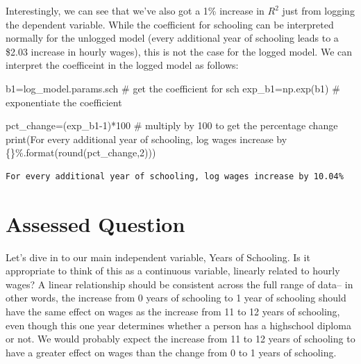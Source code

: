 \documentclass[
  letterpaper,
  DIV=11,
  numbers=noendperiod]{scrreprt}
\newenvironment{Shaded}{\begin{snugshade}}{\end{snugshade}}
\newcommand{\BuiltInTok}[1]{\textcolor[rgb]{0.00,0.23,0.31}{#1}}
\newcommand{\CommentTok}[1]{\textcolor[rgb]{0.37,0.37,0.37}{#1}}
\newcommand{\DecValTok}[1]{\textcolor[rgb]{0.68,0.00,0.00}{#1}}
\newcommand{\NormalTok}[1]{\textcolor[rgb]{0.00,0.23,0.31}{#1}}
\newcommand{\OperatorTok}[1]{\textcolor[rgb]{0.37,0.37,0.37}{#1}}
\newcommand{\SpecialCharTok}[1]{\textcolor[rgb]{0.37,0.37,0.37}{#1}}
\newcommand{\StringTok}[1]{\textcolor[rgb]{0.13,0.47,0.30}{#1}}
\begin{document}
Interestingly, we can see that we've also got a 1\% increase in \(R^2\)
just from logging the dependent variable. While the coefficient for
schooling can be interpreted normally for the unlogged model (every
additional year of schooling leads to a \$2.03 increase in hourly
wages), this is not the case for the logged model. We can interpret the
coefficeint in the logged model as follows:

\begin{Shaded}
\begin{Highlighting}[]
\NormalTok{b1}\OperatorTok{=}\NormalTok{log\_model.params.sch }\CommentTok{\# get the coefficient for sch}
\NormalTok{exp\_b1}\OperatorTok{=}\NormalTok{np.exp(b1) }\CommentTok{\# exponentiate the coefficient}

\NormalTok{pct\_change}\OperatorTok{=}\NormalTok{(exp\_b1}\OperatorTok{{-}}\DecValTok{1}\NormalTok{)}\OperatorTok{*}\DecValTok{100} \CommentTok{\# multiply by 100 to get the percentage change}
\BuiltInTok{print}\NormalTok{(}\StringTok{\textquotesingle{}For every additional year of schooling, log wages increase by }\SpecialCharTok{\{\}}\StringTok{\%\textquotesingle{}}\NormalTok{.}\BuiltInTok{format}\NormalTok{(}\BuiltInTok{round}\NormalTok{(pct\_change,}\DecValTok{2}\NormalTok{)))}
\end{Highlighting}
\end{Shaded}

\begin{verbatim}
For every additional year of schooling, log wages increase by 10.04%
\end{verbatim}


\hypertarget{assessed-question-6}{%
\chapter{Assessed Question}\label{assessed-question-6}}

Let's dive in to our main independent variable, Years of Schooling. Is
it appropriate to think of this as a continuous variable, linearly
related to hourly wages? A linear relationship should be consistent
across the full range of data-- in other words, the increase from 0
years of schooling to 1 year of schooling should have the same effect on
wages as the increase from 11 to 12 years of schooling, even though this
one year determines whether a person has a highschool diploma or not. We
would probably expect the increase from 11 to 12 years of schooling to
have a greater effect on wages than the change from 0 to 1 years of
schooling.
\end{document}
